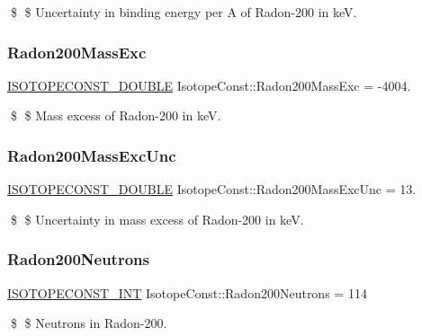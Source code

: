 \$ \$ Uncertainty in binding energy per A of Radon-\/200 in keV. \mbox{\label{group___isotope_const-_radon-_rn200_ga7543768450c8bb9c61bf6d7fddb0daa5}} 
\subsubsection{\texorpdfstring{Radon200\+Mass\+Exc}{Radon200MassExc}}
{\footnotesize\ttfamily \mbox{\hyperlink{group___isotope_const-_macros_ga8f45a7272ce02c0b4c65c44636ed719a}{I\+S\+O\+T\+O\+P\+E\+C\+O\+N\+S\+T\+\_\+\+D\+O\+U\+B\+LE}} Isotope\+Const\+::\+Radon200\+Mass\+Exc = -\/4004.}

\$ \$ Mass excess of Radon-\/200 in keV. \mbox{\label{group___isotope_const-_radon-_rn200_gaab0344a848ea9441b5640aee6b532900}} 
\subsubsection{\texorpdfstring{Radon200\+Mass\+Exc\+Unc}{Radon200MassExcUnc}}
{\footnotesize\ttfamily \mbox{\hyperlink{group___isotope_const-_macros_ga8f45a7272ce02c0b4c65c44636ed719a}{I\+S\+O\+T\+O\+P\+E\+C\+O\+N\+S\+T\+\_\+\+D\+O\+U\+B\+LE}} Isotope\+Const\+::\+Radon200\+Mass\+Exc\+Unc = 13.}

\$ \$ Uncertainty in mass excess of Radon-\/200 in keV. \mbox{\label{group___isotope_const-_radon-_rn200_gae0f61e5effd7f0e71da374b860bb7436}} 
\subsubsection{\texorpdfstring{Radon200\+Neutrons}{Radon200Neutrons}}
{\footnotesize\ttfamily \mbox{\hyperlink{group___isotope_const-_macros_ga5f18360b3e99483a35c32d789e62621c}{I\+S\+O\+T\+O\+P\+E\+C\+O\+N\+S\+T\+\_\+\+I\+NT}} Isotope\+Const\+::\+Radon200\+Neutrons = 114}

\$ \$ Neutrons in Radon-\/200. \mbox{\label{group___isotope_const-_radon-_rn200_gac7605c93384b29029125a5344c9df7c3}} 
